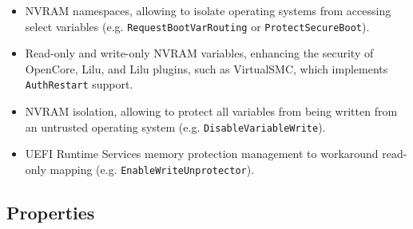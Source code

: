 \documentclass[]{article}
\begin{document}
\begin{itemize}
  \item NVRAM namespaces, allowing to isolate operating systems from accessing select
  variables (e.g. \texttt{RequestBootVarRouting} or \texttt{ProtectSecureBoot}).
  \item Read-only and write-only NVRAM variables, enhancing the security of OpenCore,
  Lilu, and Lilu plugins, such as VirtualSMC, which implements \texttt{AuthRestart} support.
  \item NVRAM isolation, allowing to protect all variables from being written from
  an untrusted operating system (e.g. \texttt{DisableVariableWrite}).
  \item UEFI Runtime Services memory protection management to workaround read-only
  mapping (e.g. \texttt{EnableWriteUnprotector}).
\end{itemize}

\subsection{Properties}\label{uefiprops}
\end{document}
